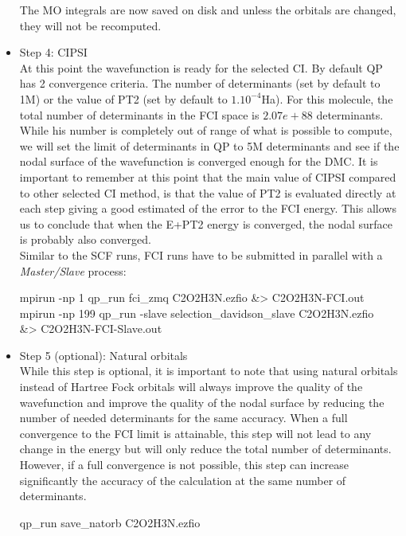 \begin{itemize}
The MO integrals are now saved on disk and unless the orbitals are changed, they will not be recomputed.\\
\item Step 4: CIPSI \\
At this point the wavefunction is ready for the selected CI. By default QP has 2 convergence criteria. The number of determinants (set by default to 1M) or the value of PT2 (set by default to $1.10^{-4}$Ha). For this molecule, the total number of determinants in the FCI space is $2.07e+88$ determinants. While his number is completely out of range of what is possible to compute, we will set the limit of determinants in QP to 5M determinants and see if the nodal surface of the wavefunction is converged enough for the DMC. It is important to remember at this point that the main value of CIPSI compared to other selected CI method, is that the value of PT2 is evaluated directly at each step giving a good estimated of the error to the FCI energy. This allows us to conclude that when the E+PT2 energy is converged, the nodal surface is probably also converged.\\
Similar to the SCF runs, FCI runs have to be submitted in parallel with a \textit{Master/Slave} process:\\

\begin{shade}
mpirun -np 1 qp_run fci_zmq C2O2H3N.ezfio &> C2O2H3N-FCI.out 
mpirun -np 199 qp_run -slave selection_davidson_slave C2O2H3N.ezfio\\
&> C2O2H3N-FCI-Slave.out 
\end{shade}

\item Step 5 (optional): Natural orbitals \\
While this step is optional, it is important to note that using natural orbitals instead of Hartree Fock orbitals will always improve the quality of the wavefunction and improve the quality of the nodal surface by reducing the number of needed determinants for the same accuracy. When a full convergence to the FCI limit is attainable, this step will not lead to any change in the energy but will only reduce the total number of determinants. However, if a full convergence is not possible, this step can increase significantly the accuracy of the calculation at the same number of determinants. \\

\begin{shade}
qp_run save_natorb C2O2H3N.ezfio  
\end{shade}
\hfill


\end{itemize}
